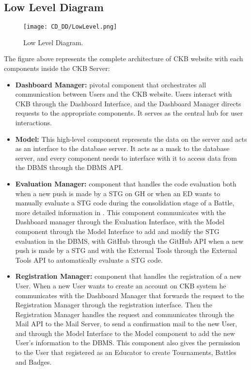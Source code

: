 \subsection{Low Level Diagram}
\label{subsec:low_level_diagram}%

\begin{figure}[H]
    \begin{center}
        \texttt{[image: CD\_DD/LowLevel.png]}
        \caption{Low Level Diagram.}
        \label{fig:low_level_diagram}%
    \end{center}
\end{figure}

\noindent The figure above represents the complete architecture of CKB website with each components inside the CKB Server:
\begin{itemize}
    \item \textbf{Dashboard Manager:} pivotal component that orchestrates all communication between Users and the CKB website. Users interact with CKB through the Dashboard Interface, and the Dashboard Manager directs requests to the appropriate components. It serves as the central hub for user interactions.
    \item \textbf{Model:} This high-level component represents the data on the server and acts as an interface to the database server. It acts as a mask to the database server, and every component needs to interface with it to access data from the DBMS through the DBMS API.
    \item \textbf{Evaluation Manager:} component that handles the code evaluation both when a new push is made by a STG on GH or when an ED wants to manually evaluate a STG code during the consolidation stage of a Battle, more detailed information in . This component communicates with the Dashboard manager through the Evaluation Interface, with the Model component through the Model Interface to add and modify the STG evaluation in the DBMS, with GitHub through the GitHub API when a new push is made by a STG and with the External Tools through the External Tools API to automatically evaluate a STG code.
    \item \textbf{Registration Manager:} component that handles the registration of a new User. When a new User wants to create an account on CKB system he communicates with the Dashboard Manager that forwards the request to the Registration Manager through the registration interface. Then the Registration Manager handles the request and communicates through the Mail API to the Mail Server, to send a confirmation mail to the new User, and through the Model Interface to the Model component to add the new User’s information to the DBMS. This component also gives the permission to the User that registered as an Educator to create Tournaments, Battles and Badges.

\end{itemize}

